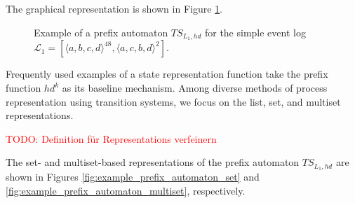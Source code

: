 The graphical representation is shown in Figure \ref{fig:example_prefix_automaton}.

\begin{figure}
    \centering
    \caption{Example of a prefix automaton $\mathit{TS}_{L_1, hd}$ for the simple event log $\mathcal{L}_1 = [ \langle a, b, c, d \rangle ^{48}, \langle a, c, b, d \rangle^2 ]$.}
    \label{fig:example_prefix_automaton}
\end{figure}

Frequently used examples of a state representation function take the prefix function $hd^k$ as its baseline mechanism. Among diverse methods of process representation using transition systems, we focus on the list, set, and multiset representations.

\textcolor{red}{TODO: Definition für Representations verfeinern}

The set- and multiset-based representations of the prefix automaton $\mathit{TS}_{L_1, hd}$ are shown in Figures \ref{fig:example_prefix_automaton_set} and \ref{fig:example_prefix_automaton_multiset}, respectively.

